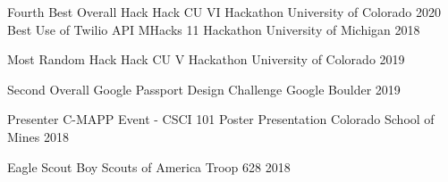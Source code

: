 
\vspace{-2.0mm}

\begin{cvhonors}

  \cvhonor
  {Fourth Best Overall Hack}
  {Hack CU VI Hackathon}
  {University of Colorado}
  {2020}
  \cvhonor
    {Best Use of Twilio API} %
    {MHacks 11 Hackathon}
    {University of Michigan} %
    {2018} %

  \cvhonor
    {Most Random Hack} %
    {Hack CU V Hackathon}
    {University of Colorado} %
    {2019} %
  
  \cvhonor
  {Second Overall}
  {Google Passport Design Challenge}
  {Google Boulder}
  {2019}

    \cvhonor
    {Presenter} %
    {C-MAPP Event - CSCI 101 Poster Presentation}
    {Colorado School of Mines} %
    {2018} %
    
    \cvhonor
    {Eagle Scout}
    {Boy Scouts of America}
    {Troop 628}
    {2018}

\end{cvhonors}

